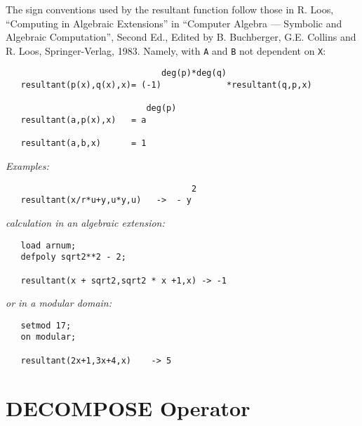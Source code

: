 The sign conventions used by the resultant function follow those in R.
Loos, ``Computing in Algebraic Extensions'' in ``Computer Algebra --- Symbolic
and Algebraic Computation'', Second Ed., Edited by B. Buchberger, G.E.
Collins and R. Loos, Springer-Verlag, 1983. Namely, with \texttt{A} and \texttt{B}
not dependent on \texttt{X}:

\begin{verbatim}
                               deg(p)*deg(q)
   resultant(p(x),q(x),x)= (-1)             *resultant(q,p,x)

                            deg(p)
   resultant(a,p(x),x)   = a

   resultant(a,b,x)      = 1
\end{verbatim}

\textit{Examples:}

\begin{samepage}
\begin{verbatim}
                                     2
   resultant(x/r*u+y,u*y,u)   ->  - y
\end{verbatim}
\end{samepage}

\textit{calculation in an algebraic extension:}

\begin{samepage}
\begin{verbatim}
   load arnum;
   defpoly sqrt2**2 - 2;

   resultant(x + sqrt2,sqrt2 * x +1,x) -> -1
\end{verbatim}
\end{samepage}

\textit{or in a modular domain:}

\begin{samepage}
\begin{verbatim}
   setmod 17;
   on modular;

   resultant(2x+1,3x+4,x)    -> 5
\end{verbatim}
\end{samepage}
\section{DECOMPOSE Operator}
\hypertarget{operator:DECOMPOSE}{}

